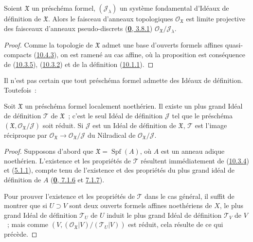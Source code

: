 \begin{proposition}[10.5.3]
\label{I.10.5.3-fr}
Soient $\mathfrak{X}$ un préschéma formel, $(\mathscr{J}_\lambda)$ un
système fondamental d'Idéaux de définition de $\mathfrak{X}$. Alors le
faisceau d'anneaux topologiques $\mathscr{O}_{\mathfrak{X}}$ est limite
projective des faisceaux d'anneaux pseudo-discrets
\textup{(\hyperref[0.3.8.1-fr]{\textbf{0}, 3.8.1})}
$\mathscr{O}_{\mathfrak{X}}/\mathscr{J}_\lambda$.
\end{proposition}

\begin{proof}
Comme la topologie de $\mathfrak{X}$ admet une base d'ouverts formels
affines quasi-compacts (\hyperref[I.10.4.3-fr]{10.4.3}), on est ramené au
cas affine, où la proposition est conséquence de
(\hyperref[I.10.3.5-fr]{10.3.5}),
(\hyperref[I.10.3.2-fr]{10.3.2}) et de la définition
(\hyperref[I.10.1.1-fr]{10.1.1}).
\end{proof}

Il n'est pas certain que tout préschéma formel admette des Idéaux de
définition. Toutefois~:

\begin{proposition}[10.5.4]
\label{I.10.5.4-fr}
Soit $\mathfrak{X}$ un préschéma formel localement noethérien. Il existe
un plus grand Idéal de définition $\mathscr{T}$ de $\mathfrak{X}$~;
c'est le seul Idéal de définition $\mathscr{J}$ tel que le préschéma
$(\mathfrak{X},\mathscr{O}_{\mathfrak{X}}/\mathscr{J})$ soit réduit. Si
$\mathscr{J}$ est un Idéal de définition de $\mathfrak{X}$,
$\mathscr{T}$ est l'image réciproque par
$\mathscr{O}_{\mathfrak{X}}\to
\mathscr{O}_{\mathfrak{X}}/\mathscr{J}$ du Nilradical de
$\mathscr{O}_{\mathfrak{X}}/\mathscr{J}$.
\end{proposition}

\begin{proof}
Supposons d'abord que $\mathfrak{X}=\operatorname{Spf}(A)$, où $A$ est
un anneau adique noethérien. L'existence et les propriétés de
$\mathscr{T}$ résultent immédiatement de
(\hyperref[I.10.3.4-fr]{10.3.4}) et
(\hyperref[I.5.1.1-fr]{5.1.1}), compte tenu de l'existence et des
propriétés du plus grand idéal de définition de $A$
(\hyperref[0.7.1.6-fr]{\textbf{0}, 7.1.6} et
\hyperref[0.7.1.7-fr]{7.1.7}).

Pour prouver l'existence et les propriétés de $\mathscr{T}$ dans le cas
général, il suffit de montrer que si $U\supset V$ sont deux ouverts
formels affines noethériens de $X$, le plus grand Idéal de
définition $\mathscr{T}_U$ de $U$ induit le plus grand Idéal de définition
$\mathscr{T}_V$ de $V$~; mais comme
$(V,(\mathscr{O}_{\mathfrak{X}}|V)/(\mathscr{T}_U|V))$ est réduit, cela
résulte de ce qui précède.
\end{proof}

